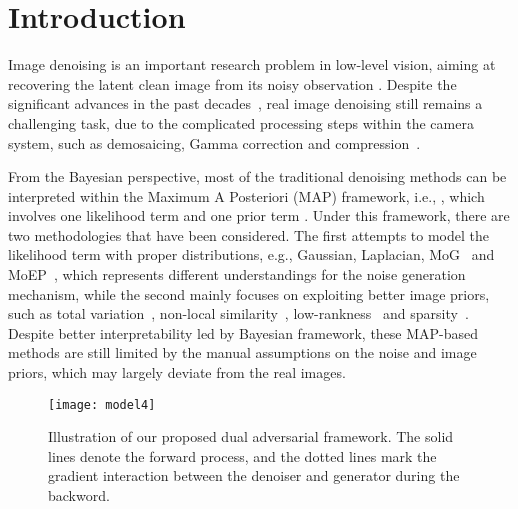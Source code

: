 \documentclass[runningheads]{llncs}
\begin{document}
\section{Introduction}

Image denoising is an important research problem in low-level vision,
aiming at recovering the latent clean image  from its noisy observation .
Despite the significant advances in the past decades~\cite{buades2005non,dabov2007image,zhang2017beyond,yue2019variational},
real image denoising still remains a challenging task, due to the complicated processing steps within
the camera system, such as demosaicing, Gamma correction and compression~\cite{tsin2001statistical}.

From the Bayesian perspective, most of the traditional denoising methods can be interpreted within the Maximum A
Posteriori (MAP) framework, i.e., , which involves one
likelihood term  and one prior term . Under this framework,
there are two methodologies that have been considered.
The first attempts to model the likelihood term with proper distributions,
e.g., Gaussian, Laplacian, MoG~\cite{Meng_2013_ICCV,zhu2016blind,yue2019robust} and MoEP~\cite{Cao_2015_ICCV},
which represents different understandings for the noise generation mechanism, while the second mainly focuses on
exploiting better image priors, such as total variation~\cite{rudin1992nonlinear}, non-local
similarity~\cite{buades2005non}, low-rankness~\cite{dong2012nonlocal,gu2014weighted,wang2018weakly,MCWNNM} and
sparsity~\cite{mairal2007sparse,zhou2009non,Xu_2018_ECCV}. Despite better interpretability led
by Bayesian framework, these MAP-based methods are still limited by the manual assumptions on the noise and
image priors, which may largely deviate from the real images.
\begin{figure}[t]
    \centering
    \texttt{[image: model4]}
    \vspace{-2mm}
    \caption{Illustration of our proposed dual adversarial framework. The solid lines denote the forward
        process, and the dotted lines mark the gradient interaction between the denoiser and generator during the
        backword. }
    \label{fig:model-framework}
\end{figure}
\end{document}
